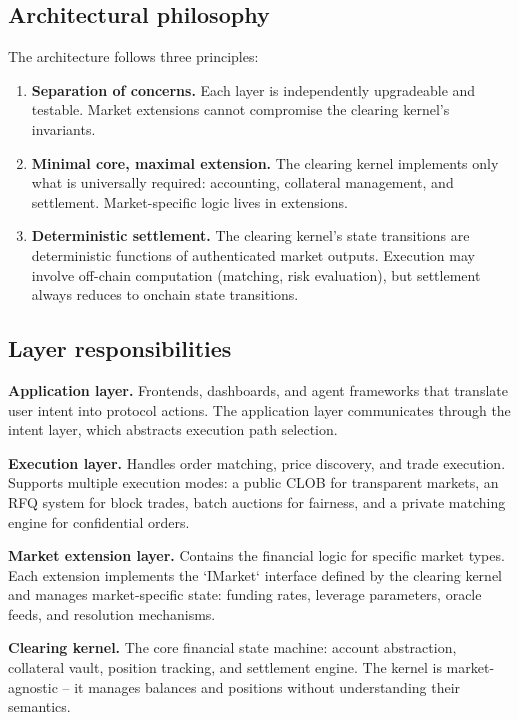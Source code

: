 \documentclass[11pt,a4paper]{article}
\begin{document}
\subsection{Architectural philosophy}

The architecture follows three principles:

\begin{enumerate}
  \item \textbf{Separation of concerns.} Each layer is independently upgradeable and testable. Market extensions cannot compromise the clearing kernel's invariants.

  \item \textbf{Minimal core, maximal extension.} The clearing kernel implements only what is universally required: accounting, collateral management, and settlement. Market-specific logic lives in extensions.

  \item \textbf{Deterministic settlement.} The clearing kernel's state transitions are deterministic functions of authenticated market outputs. Execution may involve off-chain computation (matching, risk evaluation), but settlement always reduces to onchain state transitions.
\end{enumerate}

\subsection{Layer responsibilities}

\textbf{Application layer.} Frontends, dashboards, and agent frameworks that translate user intent into protocol actions. The application layer communicates through the intent layer, which abstracts execution path selection.

\textbf{Execution layer.} Handles order matching, price discovery, and trade execution. Supports multiple execution modes: a public CLOB for transparent markets, an RFQ system for block trades, batch auctions for fairness, and a private matching engine for confidential orders.

\textbf{Market extension layer.} Contains the financial logic for specific market types. Each extension implements the `IMarket` interface defined by the clearing kernel and manages market-specific state: funding rates, leverage parameters, oracle feeds, and resolution mechanisms.

\textbf{Clearing kernel.} The core financial state machine: account abstraction, collateral vault, position tracking, and settlement engine. The kernel is market-agnostic -- it manages balances and positions without understanding their semantics.
\end{document}
